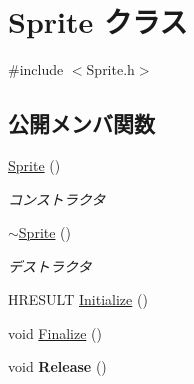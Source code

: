 \hypertarget{class_a_p_i_1_1_sprite}{}\section{Sprite クラス}
\label{class_a_p_i_1_1_sprite}


{\ttfamily \#include $<$Sprite.\+h$>$}

\subsection*{公開メンバ関数}
\begin{DoxyCompactItemize}
\item 
\hyperlink{class_a_p_i_1_1_sprite_a637dbaba7024234f1dd304df1706c371}{Sprite} ()\hypertarget{class_a_p_i_1_1_sprite_a637dbaba7024234f1dd304df1706c371}{}\label{class_a_p_i_1_1_sprite_a637dbaba7024234f1dd304df1706c371}

\begin{DoxyCompactList}\small\item\em コンストラクタ \end{DoxyCompactList}\item 
\hyperlink{class_a_p_i_1_1_sprite_ae2ec7be3ca7853c7f3ac5d639b6b951d}{$\sim$\+Sprite} ()\hypertarget{class_a_p_i_1_1_sprite_ae2ec7be3ca7853c7f3ac5d639b6b951d}{}\label{class_a_p_i_1_1_sprite_ae2ec7be3ca7853c7f3ac5d639b6b951d}

\begin{DoxyCompactList}\small\item\em デストラクタ \end{DoxyCompactList}\item 
H\+R\+E\+S\+U\+LT \hyperlink{class_a_p_i_1_1_sprite_a81109341187e54cc3585f29a1306ca50}{Initialize} ()
\item 
void \hyperlink{class_a_p_i_1_1_sprite_a8fee61d7a783cade1a3d07fe86284d27}{Finalize} ()
\item 
void {\bfseries Release} ()\hypertarget{class_a_p_i_1_1_sprite_a94c93747c8daa99d65c2a04c6be0748c}{}\label{class_a_p_i_1_1_sprite_a94c93747c8daa99d65c2a04c6be0748c}


\end{DoxyCompactItemize}
